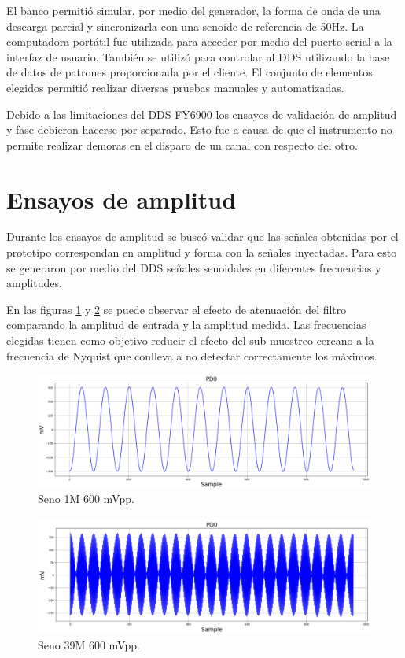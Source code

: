 El banco permitió simular, por medio del generador, la forma de onda de una descarga parcial y sincronizarla con una senoide de referencia de 50Hz. La computadora portátil fue utilizada para acceder por medio del puerto serial a la interfaz de usuario. También se utilizó para controlar al DDS utilizando la base de datos de patrones proporcionada por el cliente. El conjunto de elementos elegidos permitió realizar diversas pruebas manuales y automatizadas.

Debido a las limitaciones del DDS FY6900 los ensayos de validación de amplitud y fase debieron hacerse por separado. Esto fue a causa de que el instrumento no permite realizar demoras en el disparo de un canal con respecto del otro.


\section{Ensayos de amplitud}
Durante los ensayos de amplitud se buscó validar que las señales obtenidas por el prototipo correspondan en amplitud y forma con la señales inyectadas. Para esto se generaron por medio del DDS señales senoidales en diferentes frecuencias y amplitudes.

En las figuras \ref{fig:sin1} y \ref{fig:sin39} se puede observar el efecto de atenuación del filtro comparando la amplitud de entrada y la amplitud medida. Las frecuencias elegidas tienen como objetivo reducir el efecto del sub muestreo cercano a la frecuencia de Nyquist que conlleva a no detectar correctamente los máximos.

\vspace{5mm}

\begin{figure}[ht]
	\centering
	\includegraphics[width=140mm]{./Figures/sin1.png}
	\caption{Seno 1M 600 mVpp.}
	\label{fig:sin1}
\end{figure}

\begin{figure}[ht]
	\centering
	\includegraphics[width=140mm]{./Figures/sin39.png}
	\caption{Seno 39M 600 mVpp.}
	\label{fig:sin39}
\end{figure}


